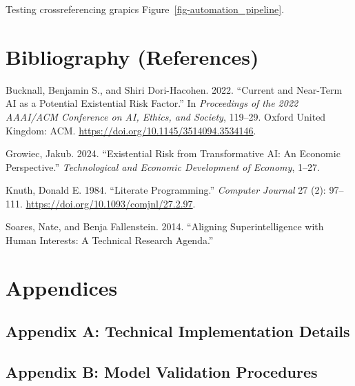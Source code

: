 \documentclass[
  letterpaper,
]{book}
\newlength{\cslhangindent}
\newenvironment{CSLReferences}[2] %
 {\begin{list}{}{%
  \setlength{\itemindent}{0pt}
  \setlength{\leftmargin}{0pt}
  \setlength{\parsep}{0pt}
  \ifodd #1
   \setlength{\leftmargin}{\cslhangindent}
   \setlength{\itemindent}{-1\cslhangindent}
  \fi
  \setlength{\itemsep}{#2\baselineskip}}}
 {\end{list}}
\begin{document}
Testing crossreferencing grapics Figure~\ref{fig-automation_pipeline}.


\chapter*{Bibliography (References)}\label{bibliography-references}


\label{refs}
\begin{CSLReferences}{1}{0}
Bucknall, Benjamin S., and Shiri Dori-Hacohen. 2022. {``Current and
{Near-Term AI} as a {Potential Existential Risk Factor}.''} In
\emph{Proceedings of the 2022 {AAAI}/{ACM Conference} on {AI}, {Ethics},
and {Society}}, 119--29. Oxford United Kingdom: ACM.
\url{https://doi.org/10.1145/3514094.3534146}.

Growiec, Jakub. 2024. {``Existential Risk from Transformative {AI}: An
Economic Perspective.''} \emph{Technological and Economic Development of
Economy}, 1--27.

Knuth, Donald E. 1984. {``Literate Programming.''} \emph{Computer
Journal} 27 (2): 97--111. \url{https://doi.org/10.1093/comjnl/27.2.97}.

Soares, Nate, and Benja Fallenstein. 2014. {``Aligning Superintelligence
with Human Interests: {A} Technical Research Agenda.''}

\end{CSLReferences}

\cleardoublepage
{}
{}
\appendix

\chapter{Appendices}\label{appendices-1}

\section{Appendix A: Technical Implementation
Details}\label{appendix-a-technical-implementation-details}

\section{Appendix B: Model Validation
Procedures}\label{appendix-b-model-validation-procedures}
\end{document}
